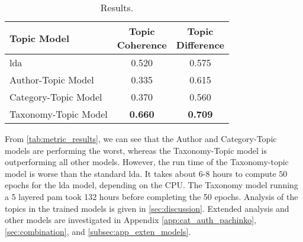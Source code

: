 \begin{table}[h]
	\centering
	\caption{Results.}
	\begin{tabular}{l|c|c}
		Topic Model & \makecell{Topic \\ Coherence} & \makecell{Topic \\ Difference} \\
		\midrule
		\Acrlong{lda} & 0.520 & 0.575 \\
		Author-Topic Model & 0.335 & 0.615 \\
		Category-Topic Model & 0.370 & 0.560 \\
		Taxonomy-Topic Model & \textbf{0.660} & \textbf{0.709} \\
	\end{tabular}
	\label{tab:metric_results}
\end{table}

From \autoref{tab:metric_results}, we can see that the Author and Category-Topic models are performing the worst, whereas the Taxonomy-Topic model is outperforming all other models.
However, the run time of the Taxonomy-topic model is worse than the standard \gls{lda}.
It takes about $6$-$8$ hours to compute $50$ epochs for the \gls{lda} model, depending on the CPU. 
The Taxonomy model running a 5 layered \gls{pam} took 132 hours before completing the 50 epochs.
Analysis of the topics in the trained models is given in \autoref{sec:discussion}.
Extended analysis and other models are investigated in Appendix \autoref{app:cat_auth_pachinko}, \autoref{sec:combination}, and \autoref{subsec:app_exten_models}.
